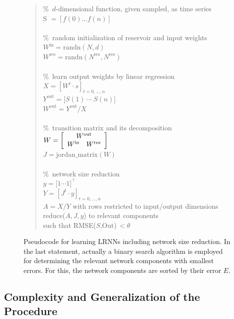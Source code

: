 \documentclass[twoside,11pt]{article}
\theoremstyle{definition}
\begin{document}
\begin{figure}[ht]
\begin{quote}
	\newcommand{\commt}[1]{\%~#1\\}%
	\commt{$d$-dimensional function, given sampled, as time series}
	S $= [ f(0) \dots f(n) ]$\\
	\\
	\commt{random initialization of reservoir and input weights}
	$W^\mathrm{in} = \mathrm{randn}(N,d)$\\
	$W^\mathrm{res} = \mathrm{randn}(N^\mathrm{res},N^\mathrm{res})$\\
	\\
	\commt{learn output weights by linear regression}
	$X = \left[W^t \cdot s\right]_{t=0,\dots,n}$\\
	$Y^\mathrm{out} = \big[ S(1)\ \cdots\ S(n) \big]$\\
	$W^\mathrm{out} = Y^\mathrm{out}/X$\\
	\\
	\commt{transition matrix and its decomposition}
	$W = \left[ \begin{array}{cc}
		\multicolumn{2}{c}{W^\mathrm{out}}\\
		W^\mathrm{in} & W^\mathrm{res}
	\end{array} \right]$\\
	$J = \mathrm{jordan\_matrix}(W)$\\
	\\
	\commt{network size reduction}
	$y = \big[ 1 \cdots 1 \big]^\top$\\
	$Y = \left[J^t \cdot y\right]_{t=0,\dots,n}$\\
	$A = X/Y$ with rows restricted to input/output dimensions\\
	reduce($A,J,y$) to relevant components\\
	\hspace*{0.5cm} such that RMSE($S$,Out)\,$<\theta$
\end{quote}
\caption{Pseudocode for learning LRNNs including network size reduction. In the
last statement, actually a binary search algorithm is employed for determining
the relevant network components with smallest errors. For this, the network
components are sorted by their error $E$.}
\label{proc}
\end{figure}

\subsection{Complexity and Generalization of the Procedure}
\end{document}
